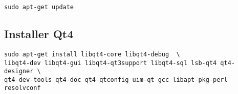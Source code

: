 \begin{verbatim}
sudo apt-get update 
\end{verbatim}

% 
% 
% 
% 
% 
% 

\subsection{Installer Qt4}
\begin{verbatim}
sudo apt-get install libqt4-core libqt4-debug  \
libqt4-dev libqt4-gui libqt4-qt3support libqt4-sql lsb-qt4 qt4-designer \
qt4-dev-tools qt4-doc qt4-qtconfig uim-qt gcc libapt-pkg-perl resolvconf
\end{verbatim}

